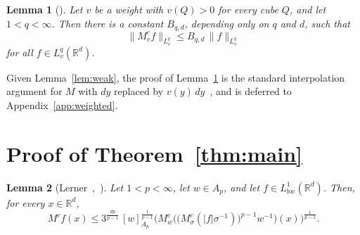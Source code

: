 \documentclass[12pt]{article}
\newtheorem{lemma}{Lemma}
\begin{document}
\begin{lemma}[{\cite[Theorem~1.10]{Duoandikoetxea2013}}]\label{lem:key}
Let $v$ be a weight with $v(Q) > 0$ for every cube $Q$, and let $1 < q < \infty$. Then there is a constant $B_{q,d}$, depending only on $q$ and $d$, such that
\[
  \|M^c_v f\|_{L^q_v} \le B_{q,d}\, \|f\|_{L^q_v}
\]
for all $f \in L^q_v(\mathbb{R}^d)$.
\end{lemma}

Given Lemma~\ref{lem:weak}, the proof of Lemma~\ref{lem:key} is the standard interpolation argument for $M$ with $dy$ replaced by $v(y)\,dy$~\cite[Section~2.1.1]{GrafakosClassical}, and is deferred to Appendix~\ref{app:weighted}.

\section{Proof of Theorem~\ref{thm:main}}\label{sec:main}

\begin{lemma}[{Lerner~\cite[proof of Theorem~C]{Lerner2008},~\cite[proof of Theorem~1.12]{Duoandikoetxea2013}}]\label{lem:lerner}
Let $1 < p < \infty$, let $w \in A_p$, and let $f \in L^1_{\mathrm{loc}}(\mathbb{R}^d)$. Then, for every $x \in \mathbb{R}^d$,
\[
  M^c f(x) \le 3^{\frac{dp}{p-1}}\, [w]_{A_p}^{\frac{1}{p-1}} \Big( M^c_w\Big( \big(M^c_\sigma(|f|\sigma^{-1})\big)^{p-1} w^{-1} \Big)(x) \Big)^{\frac{1}{p-1}} .
\]
\end{lemma}
\end{document}
